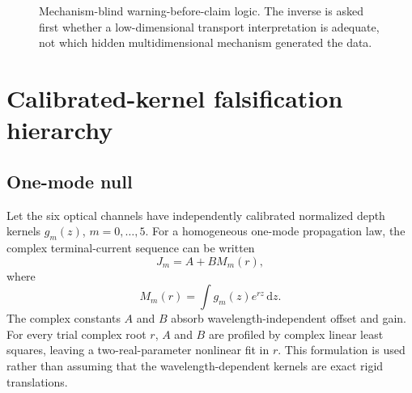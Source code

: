 \documentclass[11pt]{article}
\newcommand{\dd}{\mathrm{d}}
\begin{document}
\begin{figure}[H]
\centering
{}
\caption{Mechanism-blind warning-before-claim logic. The inverse is asked first whether a low-dimensional transport interpretation is adequate, not which hidden multidimensional mechanism generated the data.}
\label{fig:logic}
\end{figure}

\section{Calibrated-kernel falsification hierarchy}

\subsection{One-mode null}

Let the six optical channels have independently calibrated normalized depth kernels $g_m(z)$, $m=0,\ldots,5$. For a homogeneous one-mode propagation law, the complex terminal-current sequence can be written
\begin{equation}
\boxed{J_m=A+B M_m(r),}
\label{eq:onemode}
\end{equation}
where
\begin{equation}
M_m(r)=\int g_m(z)e^{rz}\,\dd z.
\label{eq:kernelmoment}
\end{equation}
The complex constants $A$ and $B$ absorb wavelength-independent offset and gain. For every trial complex root $r$, $A$ and $B$ are profiled by complex linear least squares, leaving a two-real-parameter nonlinear fit in $r$. This formulation is used rather than assuming that the wavelength-dependent kernels are exact rigid translations.
\end{document}
